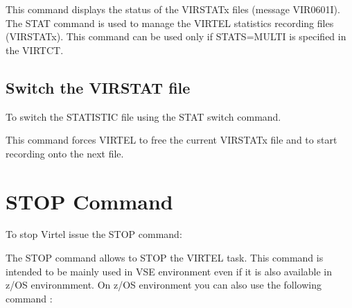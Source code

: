 \documentclass[letterpaper,10pt,english]{sphinxmanual}
\begin{document}
\begin{sphinxVerbatim}[commandchars=\\\{\}]
\end{sphinxVerbatim}

This command displays the status of the VIRSTATx files (message VIR0601I). The STAT command is used to manage the VIRTEL statistics recording files (VIRSTATx). This command can be used only if STATS=MULTI is specified in the VIRTCT.


\subsection{Switch the VIRSTAT file}
\label{\detokenize{audit_operations_ and_performance:switch-the-virstat-file}}
To switch the STATISTIC file using the STAT switch command.

\begin{sphinxVerbatim}[commandchars=\\\{\}]
\end{sphinxVerbatim}

This command forces VIRTEL to free the current VIRSTATx file and to start recording onto the next file.


\section{STOP Command}
\label{\detokenize{audit_operations_ and_performance:stop-command}}\label{\detokenize{audit_operations_ and_performance:index-24}}
To stop Virtel issue the STOP command:

\begin{sphinxVerbatim}[commandchars=\\\{\}]
\end{sphinxVerbatim}

The STOP command allows to STOP the VIRTEL task. This command is intended to be mainly used in VSE environment even if it is also available in z/OS environmment. On z/OS environment you can also use the following command :

\begin{sphinxVerbatim}[commandchars=\\\{\}]
 
\end{sphinxVerbatim}

\end{document}
